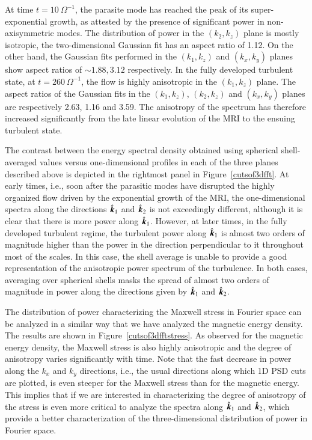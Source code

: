 \documentclass[]{emulateapj}
\newcommand\bb[1]{\mbox{\boldmath{$#1$}}}
\begin{document}
At time $t=10~\Omega^{-1}$, the parasite mode has reached the peak of its 
super-exponential growth, as attested by the presence of 
significant power in non-axisymmetric modes.
The distribution of power in the  $(k_2,k_z)$ plane is mostly 
isotropic, the two-dimensional Gaussian fit has an aspect ratio 
of 1.12. On the other hand, the Gaussian fits performed in the 
$(k_1,k_z)$ and $(k_x,k_y)$ planes show aspect ratios of 
$\sim 1.88, 3.12$ respectively. 
In the fully developed turbulent state, at $t=260~\Omega^{-1}$, the flow is highly 
anisotropic in the $(k_1,k_z)$ plane. The aspect ratios of the Gaussian fits 
in the $(k_1,k_z)$, $(k_2,k_z)$ and $(k_x,k_y)$ planes are respectively 2.63, 1.16 and 3.59.
The anisotropy of the spectrum has therefore increased significantly
from the late linear evolution of the MRI to the ensuing turbulent state.

The contrast between the energy spectral density obtained using 
spherical shell-averaged values versus one-dimensional profiles 
in each of the three planes described above is depicted in the rightmost 
panel in Figure~\ref{cutsof3dfft}.  At early times, i.e., soon after
the parasitic modes have disrupted the highly organized flow 
driven by the exponential growth of the MRI, the one-dimensional
spectra along the directions $\hat{\bb{k}}_{1}$ and $\hat{\bb{k}}_{2}$
is not exceedingly different, although it is clear that there is more power 
along $\hat{\bb{k}}_{1}$. However, at later times, in the fully developed turbulent 
regime, the turbulent power along $\hat{\bb{k}}_{1}$ is almost two orders of 
magnitude higher than the power in the direction perpendicular to it 
throughout most of the scales. 
In this case, the shell average is unable to provide a good 
representation of the anisotropic power spectrum of the turbulence. 
In both cases, averaging over spherical shells masks the spread
of almost two orders of magnitude in power along the directions
given by $\hat{\bb{k}}_{1}$ and $\hat{\bb{k}}_{2}$.



The distribution of power characterizing the Maxwell stress in Fourier 
space can be analyzed in a similar way that we have analyzed the
magnetic energy density. The results are shown in Figure~\ref{cutsof3dfftstress}.
As observed for the magnetic energy density, the Maxwell stress is also
highly anisotropic and the degree of anisotropy varies significantly with time.
Note that the fast decrease in power along the  $k_x$ and $k_y$ directions, 
i.e., the usual directions along which 1D PSD cuts are plotted, is even steeper
for the Maxwell stress than for the magnetic energy.
This implies that if we are interested in characterizing the degree of anisotropy 
of the stress is even more critical to analyze the spectra along 
$\hat{\bb{k}}_{1}$ and $\hat{\bb{k}}_{2}$, which provide a better characterization
of the three-dimensional distribution of power in Fourier space.
\end{document}
